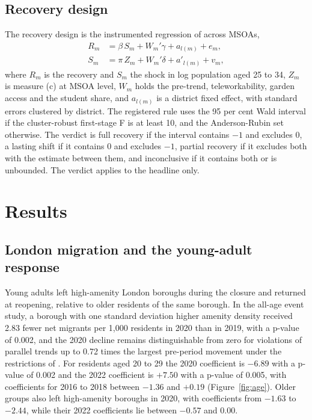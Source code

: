 \documentclass[11pt,a4paper]{article}
\begin{document}
\subsection{Recovery design}

The recovery design is the instrumented regression of \citet{davis2002} across MSOAs,
\begin{equation}\label{eq:rec}
\begin{aligned}
R_m &= \beta\, S_m + W_m' \gamma + a_{l(m)} + e_m, \\
S_m &= \pi\, Z_m + W_m' \delta + a'_{l(m)} + v_m,
\end{aligned}
\end{equation}
where $R_m$ is the recovery and $S_m$ the shock in log population aged 25 to 34, $Z_m$ is measure (c) at MSOA level, $W_m$ holds the pre-trend, teleworkability, garden access and the student share, and $a_{l(m)}$ is a district fixed effect, with standard errors clustered by district. The registered rule uses the 95 per cent Wald interval if the cluster-robust first-stage F is at least 10, and the Anderson-Rubin set otherwise. The verdict is full recovery if the interval contains $-1$ and excludes 0, a lasting shift if it contains 0 and excludes $-1$, partial recovery if it excludes both with the estimate between them, and inconclusive if it contains both or is unbounded. The verdict applies to the headline only.

\section{Results}\label{sec:results}

\subsection{London migration and the young-adult response}\label{sec:london}

Young adults left high-amenity London boroughs during the closure and returned at reopening, relative to older residents of the same borough. In the all-age event study, a borough with one standard deviation higher amenity density received 2.83 fewer net migrants per 1,000 residents in 2020 than in 2019, with a p-value of 0.002, and the 2020 decline remains distinguishable from zero for violations of parallel trends up to 0.72 times the largest pre-period movement under the restrictions of \citet{rambachan2023}. For residents aged 20 to 29 the 2020 coefficient is $-6.89$ with a p-value of 0.002 and the 2022 coefficient is $+7.50$ with a p-value of 0.005, with coefficients for 2016 to 2018 between $-1.36$ and $+0.19$ (Figure~\ref{fig:age}). Older groups also left high-amenity boroughs in 2020, with coefficients from $-1.63$ to $-2.44$, while their 2022 coefficients lie between $-0.57$ and 0.00.
\end{document}
